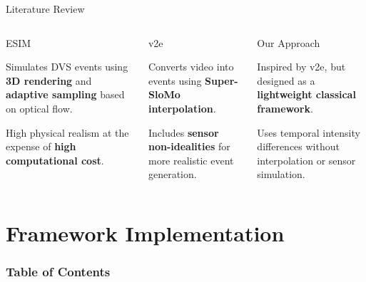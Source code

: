 \documentclass[10pt,xcolor=x11names,compress]{beamer}
\begin{document}
\begin{frame}{Literature Review}

  \begin{columns}[T]


    \begin{block}{ESIM}

      Simulates DVS events using \textbf{3D rendering} and
      \textbf{adaptive sampling} based on optical flow.

      \vspace{0.3cm}

      High physical realism at the expense of
      \textbf{high computational cost}.

    \end{block}


    \begin{block}{v2e}

      Converts video into events using
      \textbf{Super-SloMo interpolation}.

      \vspace{0.3cm}

      Includes \textbf{sensor non-idealities} for
      more realistic event generation.

    \end{block}


    \begin{block}{Our Approach}

      Inspired by v2e, but designed as a
      \textbf{lightweight classical framework}.

      \vspace{0.3cm}

      Uses temporal intensity differences
      without interpolation or sensor simulation.

    \end{block}

  \end{columns}

\end{frame}

\section{Framework Implementation}

\begin{frame}
  \frametitle{\textbf{Table of Contents}}
  \tableofcontents[
  hideallsubsections=false
  sectionstyle=show/shaded,    
  subsectionstyle=show/shaded/hide, 
  section=1-100                
  ]
\end{frame}
\end{document}
